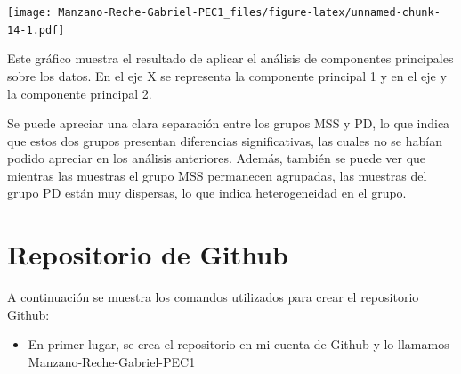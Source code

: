 \documentclass[
]{article}
\newenvironment{Shaded}{\begin{snugshade}}{\end{snugshade}}
\newcommand{\AttributeTok}[1]{\textcolor[rgb]{0.13,0.29,0.53}{#1}}
\newcommand{\ConstantTok}[1]{\textcolor[rgb]{0.56,0.35,0.01}{#1}}
\newcommand{\DecValTok}[1]{\textcolor[rgb]{0.00,0.00,0.81}{#1}}
\newcommand{\FloatTok}[1]{\textcolor[rgb]{0.00,0.00,0.81}{#1}}
\newcommand{\FunctionTok}[1]{\textcolor[rgb]{0.13,0.29,0.53}{\textbf{#1}}}
\newcommand{\NormalTok}[1]{#1}
\newcommand{\SpecialCharTok}[1]{\textcolor[rgb]{0.81,0.36,0.00}{\textbf{#1}}}
\newcommand{\StringTok}[1]{\textcolor[rgb]{0.31,0.60,0.02}{#1}}
\providecommand{\tightlist}{%
  \setlength{\itemsep}{0pt}\setlength{\parskip}{0pt}}
\begin{document}
\begin{Shaded}
\end{Shaded}

\texttt{[image: Manzano-Reche-Gabriel-PEC1\_files/figure-latex/unnamed-chunk-14-1.pdf]}

Este gráfico muestra el resultado de aplicar el análisis de componentes
principales sobre los datos. En el eje X se representa la componente
principal 1 y en el eje y la componente principal 2.

Se puede apreciar una clara separación entre los grupos MSS y PD, lo que
indica que estos dos grupos presentan diferencias significativas, las
cuales no se habían podido apreciar en los análisis anteriores. Además,
también se puede ver que mientras las muestras el grupo MSS permanecen
agrupadas, las muestras del grupo PD están muy dispersas, lo que indica
heterogeneidad en el grupo.

\section{Repositorio de Github}\label{repositorio-de-github}

A continuación se muestra los comandos utilizados para crear el
repositorio Github:

\begin{itemize}
\tightlist
\item
  En primer lugar, se crea el repositorio en mi cuenta de Github y lo
  llamamos Manzano-Reche-Gabriel-PEC1
\end{itemize}
\end{document}
